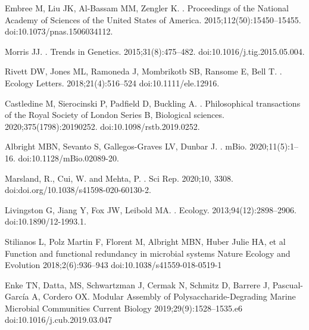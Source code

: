 \documentclass[10pt,letterpaper]{article}
\begin{document}
\begin{thebibliography}{10}
Embree M, Liu JK, Al-Bassam MM, Zengler K.
.
\newblock Proceedings of the National Academy of Sciences of the United States of America. 2015;112(50):15450–15455.
\newblock doi:{10.1073/pnas.1506034112}.

Morris JJ.
.
\newblock Trends in Genetics. 2015;31(8):475--482.
\newblock doi:{10.1016/j.tig.2015.05.004}.

Rivett DW, Jones ML, Ramoneda J, Mombrikotb SB, Ransome E, Bell T.
.
\newblock Ecology Letters. 2018;21(4):516--524
\newblock doi:{10.1111/ele.12916}.

Castledine M, Sierocinski P, Padfield D, Buckling A.
.
\newblock Philosophical transactions of the Royal Society of London Series B, Biological sciences. 2020;375(1798):20190252.
\newblock doi:{10.1098/rstb.2019.0252}.

Albright MBN, Sevanto S, Gallegos-Graves LV, Dunbar J.
.
\newblock mBio. 2020;11(5):1--16.
\newblock doi:{10.1128/mBio.02089-20}.

Marsland, R., Cui, W. and Mehta, P.
.
\newblock Sci Rep. 
2020;10, 3308. 
\newblock doi:{doi.org/10.1038/s41598-020-60130-2}.

Livingston G, Jiang Y, Fox JW, Leibold MA.
.
\newblock Ecology. 2013;94(12):2898--2906.
\newblock doi:{10.1890/12-1993.1}.

Stilianos L, Polz Martin F, Florent M, Albright MBN, Huber Julie HA, et al
\newblock Function and functional redundancy in microbial systems
\newblock Nature Ecology and Evolution 2018;2(6):936--943
\newblock doi:{10.1038/s41559-018-0519-1}

Enke TN, Datta, MS, Schwartzman J, Cermak N, Schmitz D, Barrere J, Pascual-García A, Cordero OX.
\newblock Modular Assembly of Polysaccharide-Degrading Marine Microbial Communities
\newblock Current Biology 2019;29(9):1528--1535.e6
\newblock doi:{10.1016/j.cub.2019.03.047}


\end{thebibliography}
\end{document}
